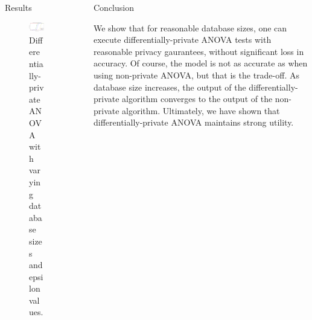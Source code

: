 \documentclass[final]{beamer}
\newlength{\sepwid}
\newlength{\onecolwid}
\newlength{\twocolwid}
\begin{document}
\begin{frame}[t]
\begin{columns}[t]
\begin{column}{\twocolwid}
\begin{columns}[t,totalwidth=\twocolwid]
\begin{column}{\onecolwid}
\begin{block}{Results}
\begin{figure}
\includegraphics[width=1.0\linewidth]{varest1000_1.png}
\caption{Differentially-private ANOVA with varying database sizes and epsilon values.}
\end{figure}

\end{block}


\end{column} %

\end{columns} %

\end{column} %

\begin{column}{\sepwid}\end{column} %

\begin{column}{\onecolwid} %


\begin{block}{Conclusion}

We show that for reasonable database sizes, one can execute differentially-private ANOVA 
tests with reasonable privacy gaurantees, without significant loss in accuracy. Of course,
the model is not as accurate as when using non-private ANOVA, but that is the trade-off. As 
database size increases, the output of the differentially-private algorithm converges to 
the output of the non-private algorithm. Ultimately, we have shown that differentially-private ANOVA maintains strong utility.


\end{block}
\end{column}
\end{columns}
\end{frame}
\end{document}
